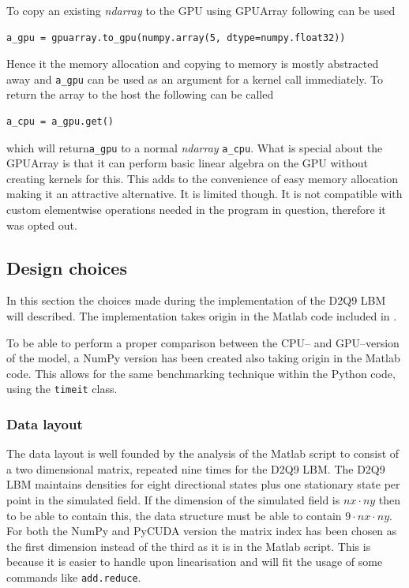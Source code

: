 To copy an existing \textit{ndarray} to the GPU using GPUArray following can be used

\begin{verbatim}
a_gpu = gpuarray.to_gpu(numpy.array(5, dtype=numpy.float32))
\end{verbatim}

Hence it the memory allocation and copying to memory is mostly abstracted away and \texttt{a\_gpu} can be used as an argument for a kernel call immediately. To return the array to the host the following can be called

\begin{verbatim}
a_cpu = a_gpu.get()
\end{verbatim}

which will return\texttt{a\_gpu} to a normal \textit{ndarray} \texttt{a\_cpu}. What is special about the GPUArray is that it can perform basic linear algebra on the GPU without creating kernels for this. This adds to the convenience of easy memory allocation making it an attractive alternative. It is limited though. It is not compatible with custom elementwise operations needed in the program in question, therefore it was opted out.



\subsection{Design choices}
In this section the choices made during the implementation of the D2Q9 LBM will described. The implementation takes origin in the Matlab code included in .

To be able to perform a proper comparison between the CPU-- and GPU--version of the model, a NumPy version has been created also taking origin in the Matlab code. This allows for the same benchmarking technique within the Python code, using the \texttt{timeit} class.


\subsubsection{Data layout}
The data layout is well founded by the analysis of the Matlab script to consist of a two dimensional matrix, repeated nine times for the D2Q9 LBM. The D2Q9 LBM maintains densities for eight directional states plus one stationary state per point in the simulated field. If the dimension of the simulated field is $nx \cdot ny$ then to be able to contain this, the data structure must be able to contain $9 \cdot nx \cdot ny$. For both the NumPy and PyCUDA version the matrix index has been chosen as the first dimension instead of the third as it is in the Matlab script. This is because it is easier to handle upon linearisation and will fit the usage of some commands like \texttt{add.reduce}.


